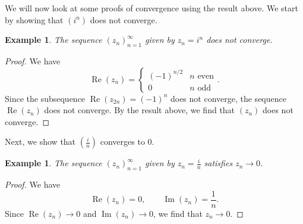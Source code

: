 \documentclass[a4paper, openany]{memoir}
\theoremstyle{definition}
\theoremstyle{plain}
\newtheorem{example}[definition]{Example}
\begin{document}
\noindent We will now look at some proofs of convergence using the result above. We start by showing that $(i^n)$ does not converge.
\begin{example}
The sequence $(z_n)_{n=1}^{\infty}$ given by $z_n = i^n$ does not converge.
\end{example}
\begin{proof}
We have
\[\operatorname{Re}(z_n) = \begin{cases}
(-1)^{n/2} & n \text{ even} \\
0 & n \text{ odd}
\end{cases}.\]
Since the subsequence $\operatorname{Re}(z_{2n}) = (-1)^n$ does not converge, the sequence $\operatorname{Re}(z_n)$ does not converge. By the result above, we find that $(z_n)$ does not converge.
\end{proof}
\noindent Next, we show that $(\frac{i}{n})$ converges to 0.
\begin{example}
The sequence $(z_n)_{n=1}^{\infty}$ given by $z_n = \frac{i}{n}$ satisfies $z_n \to 0$.
\end{example}
\begin{proof}
We have
\[\operatorname{Re}(z_n) = 0, \qquad \operatorname{Im}(z_n) = \frac{1}{n}.\]
Since $\operatorname{Re}(z_n) \to 0$ and $\operatorname{Im}(z_n) \to 0$, we find that $z_n \to 0$.
\end{proof}
\end{document}
